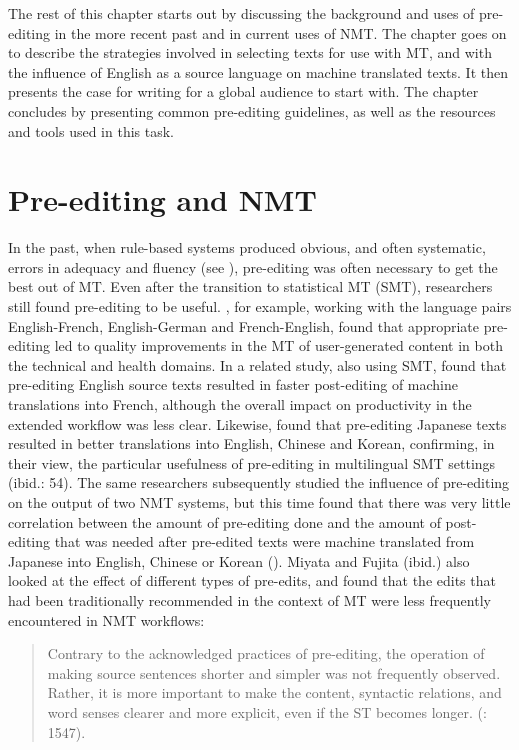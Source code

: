 \documentclass[output=paper,colorlinks,citecolor=brown,
]{langscibook}
\begin{document}
The rest of this chapter starts out by discussing the background and uses of pre-editing in the more recent past and in current uses of NMT. The chapter goes on to describe the strategies involved in selecting texts for use with MT, and with the influence of English as a source language on machine translated texts. It then presents the case for writing for a global audience to start with. The chapter concludes by presenting common pre-editing guidelines, as well as the resources and tools used in this task. 

\section{Pre-editing and NMT}\label{sec:sanchez:2}

In the past, when rule-based systems produced obvious, and often systematic, errors in adequacy and fluency (see ), pre-editing was often necessary to get the best out of MT. Even after the transition to statistical MT (SMT), researchers still found pre-editing to be useful. \citet{SeretanGerlach2014}, for example, working with the language pairs English-French, English-German and French-English, found that appropriate pre-editing led to quality improvements in the MT of user-generated content in both the technical and health domains. In a related study, also using SMT, \citet{Gerlach2015} found that pre-editing English source texts resulted in faster post-editing of machine translations into French, although the overall impact on productivity in the extended workflow was less clear. Likewise, \citet{MiyataFujita2017} found that pre-editing Japanese texts resulted in better translations into English, Chinese and Korean, confirming, in their view, the particular usefulness of pre-editing in multilingual SMT settings (ibid.: 54).  The same researchers subsequently studied the influence of pre-editing on the output of two NMT systems, but this time found that there was very little correlation between the amount of pre-editing done and the amount of post-editing that was needed after pre-edited texts were machine translated from Japanese into English, Chinese or Korean (\citealt{MiyataFujita2021}). Miyata and Fujita (ibid.) also looked at the effect of different types of pre-edits, and found that the edits that had been traditionally recommended in the context of MT were less frequently encountered in NMT workflows:

\begin{quote}
Contrary to the acknowledged practices of pre-editing, the operation of making source sentences shorter and simpler was not frequently observed. Rather, it is more important to make the content, syntactic relations, and word senses clearer and more explicit, even if the ST becomes longer. (\citealt{MiyataFujita2021}: 1547).
\end{quote}
\end{document}
